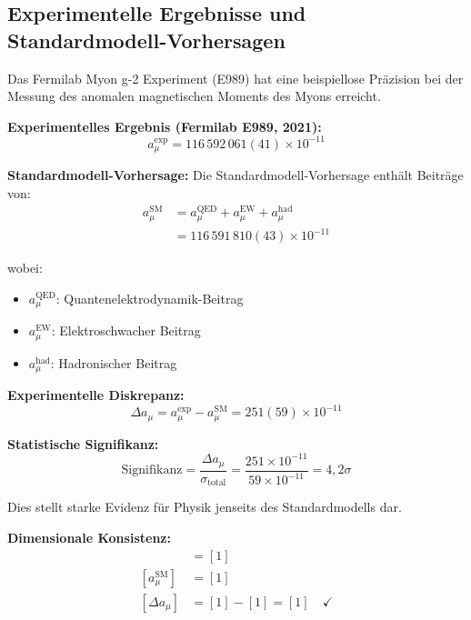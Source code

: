 \documentclass[12pt,a4paper]{report}
\begin{document}
	\subsection{Experimentelle Ergebnisse und Standardmodell-Vorhersagen}
	\label{subsec:experimental_results}
	
	Das Fermilab Myon g-2 Experiment (E989) hat eine beispiellose Präzision bei der Messung des anomalen magnetischen Moments des Myons erreicht.
	
	\textbf{Experimentelles Ergebnis (Fermilab E989, 2021):}
	\begin{equation}
		a_\mu^{\text{exp}} = 116\,592\,061(41) \times 10^{-11}
		\label{eq:experimental_value}
	\end{equation}
	
	\textbf{Standardmodell-Vorhersage:}
	Die Standardmodell-Vorhersage enthält Beiträge von:
	\begin{align}
		a_\mu^{\text{SM}} &= a_\mu^{\text{QED}} + a_\mu^{\text{EW}} + a_\mu^{\text{had}} \\
		&= 116\,591\,810(43) \times 10^{-11}
	\end{align}
	
	wobei:
	\begin{itemize}
		\item $a_\mu^{\text{QED}}$: Quantenelektrodynamik-Beitrag
		\item $a_\mu^{\text{EW}}$: Elektroschwacher Beitrag  
		\item $a_\mu^{\text{had}}$: Hadronischer Beitrag
	\end{itemize}
	
	\textbf{Experimentelle Diskrepanz:}
	\begin{equation}
		\Delta a_\mu = a_\mu^{\text{exp}} - a_\mu^{\text{SM}} = 251(59) \times 10^{-11}
		\label{eq:discrepancy}
	\end{equation}
	
	\textbf{Statistische Signifikanz:}
	\begin{equation}
		\text{Signifikanz} = \frac{\Delta a_\mu}{\sigma_{\text{total}}} = \frac{251 \times 10^{-11}}{59 \times 10^{-11}} = 4,2\sigma
	\end{equation}
	
	Dies stellt starke Evidenz für Physik jenseits des Standardmodells dar.
	
	\textbf{Dimensionale Konsistenz:}
	\begin{align}
		[a_\mu^{\text{exp}}] &= [1] \\
		[a_\mu^{\text{SM}}] &= [1] \\
		[\Delta a_\mu] &= [1] - [1] = [1] \quad \checkmark
	\end{align}
	
\end{document}
